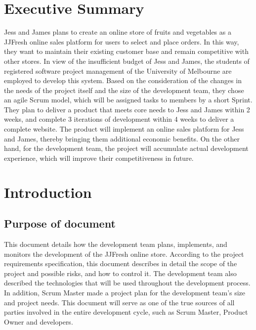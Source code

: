 \documentclass{report}
\begin{document}
\chapter*{Executive Summary}\label{sec:ESummary}
Jess and James plans to create an online store of fruits and vegetables as a JJFresh online sales platform for users to select and place orders. In this way, they want to maintain their existing customer base and remain competitive with other stores. In view of the insufficient budget of Jess and James, the students of registered software project management of the University of Melbourne are employed to develop this system. Based on the consideration of the changes in the needs of the project itself and the size of the development team, they chose an agile Scrum model, which will be assigned tasks to members by a short Sprint. They plan to deliver a product that meets core needs to Jess and James within 2 weeks, and complete 3 iterations of development within 4 weeks to deliver a complete website. The product will implement an online sales platform for Jess and James, thereby bringing them additional economic benefits. On the other hand, for the development team, the project will accumulate actual development experience, which will improve their competitiveness in future. 

\pagebreak
\clearpage

\tableofcontents
\pagebreak

\chapter{Introduction}
\section{Purpose of document}
   This document details how the development team plans, implements, and monitors the development of the JJFresh online store. According to the project requirements specification, this document describes in detail the scope of the project and possible risks, and how to control it. The development team also described the technologies that will be used throughout the development process. In addition, Scrum Master made a project plan for the development team's size and project needs. This document will serve as one of the true sources of all parties involved in the entire development cycle, such as Scrum Master, Product Owner and developers.
\end{document}
